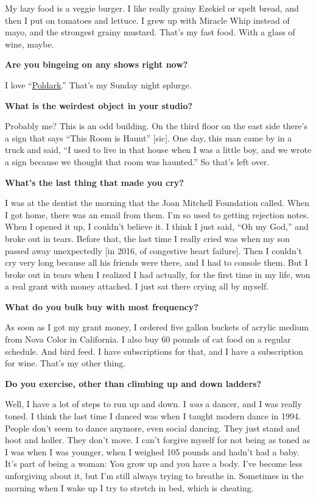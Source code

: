 My lazy food is a veggie burger. I like really grainy Ezekiel or spelt
bread, and then I put on tomatoes and lettuce. I grew up with Miracle
Whip instead of mayo, and the strongest grainy mustard. That's my fast
food. With a glass of wine, maybe.

\textbf{Are you bingeing on any shows right now?}

I love
``\href{https://www.nytimes3xbfgragh.onion/watching/recommendations/poldark}{Poldark}.''
That's my Sunday night splurge.

\textbf{What is the weirdest object in your studio?}

Probably me? This is an odd building. On the third floor on the east
side there's a sign that says ``This Room is Haunt'' {[}sic{]}. One day,
this man came by in a truck and said, ``I used to live in that house
when I was a little boy, and we wrote a sign because we thought that
room was haunted.'' So that's left over.

\textbf{What's the last thing that made you cry?}

I was at the dentist the morning that the Joan Mitchell Foundation
called. When I got home, there was an email from them. I'm so used to
getting rejection notes. When I opened it up, I couldn't believe it. I
think I just said, ``Oh my God,'' and broke out in tears. Before that,
the last time I really cried was when my son passed away unexpectedly
{[}in 2016, of congestive heart failure{]}. Then I couldn't cry very
long because all his friends were there, and I had to console them. But
I broke out in tears when I realized I had actually, for the first time
in my life, won a real grant with money attached. I just sat there
crying all by myself.

\textbf{What do you bulk buy with most frequency?}

As soon as I got my grant money, I ordered five gallon buckets of
acrylic medium from Nova Color in California. I also buy 60 pounds of
cat food on a regular schedule. And bird feed. I have subscriptions for
that, and I have a subscription for wine. That's my other thing.

\textbf{Do you exercise, other than climbing up and down ladders?}

Well, I have a lot of steps to run up and down. I \emph{was} a dancer,
and I was really toned. I think the last time I danced was when I taught
modern dance in 1994. People don't seem to dance anymore, even social
dancing. They just stand and hoot and holler. They don't move. I can't
forgive myself for not being as toned as I was when I was younger, when
I weighed 105 pounds and hadn't had a baby. It's part of being a woman:
You grow up and you have a body. I've become less unforgiving about it,
but I'm still always trying to breathe in. Sometimes in the morning when
I wake up I try to stretch in bed, which is cheating.

